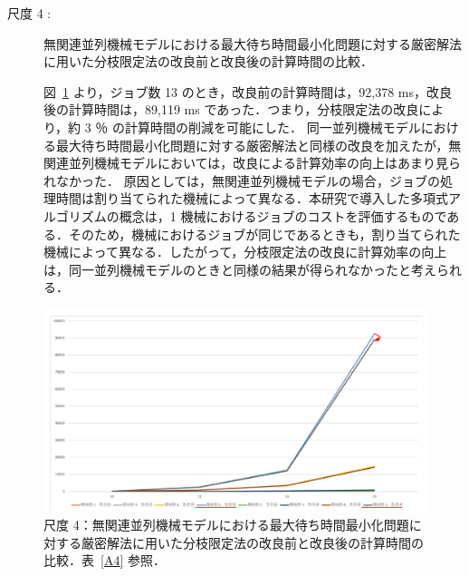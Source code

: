 \documentclass[12pt]{optlab-bachelor}
\begin{document}
\newpage
\begin{description}
  \item[尺度 4 :] 無関連並列機械モデルにおける最大待ち時間最小化問題に対する厳密解法に用いた分枝限定法の改良前と改良後の計算時間の比較．

  図~\ref{5.4} より，ジョブ数 13 のとき，改良前の計算時間は，92,378 ms，改良後の計算時間は，89,119 ms であった．つまり，分枝限定法の改良により，約 3 ％ の計算時間の削減を可能にした．
  同一並列機械モデルにおける最大待ち時間最小化問題に対する厳密解法と同様の改良を加えたが，無関連並列機械モデルにおいては，改良による計算効率の向上はあまり見られなかった．
  原因としては，無関連並列機械モデルの場合，ジョブの処理時間は割り当てられた機械によって異なる．本研究で導入した多項式アルゴリズムの概念は，1 機械におけるジョブのコストを評価するものである．そのため，機械におけるジョブが同じであるときも，割り当てられた機械によって異なる．したがって，分枝限定法の改良に計算効率の向上は，同一並列機械モデルのときと同様の結果が得られなかったと考えられる．
\end{description}
\begin{figure}[ht]
  \centering
  \includegraphics[width = 16cm]{figure/BandBTimeUn.pdf}
  \caption{尺度 4：無関連並列機械モデルにおける最大待ち時間最小化問題に対する厳密解法に用いた分枝限定法の改良前と改良後の計算時間の比較．表~\ref{A4} 参照．}
  \label{5.4}
\end{figure}
\end{document}
